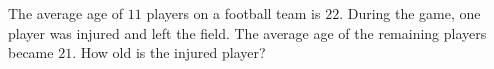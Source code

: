 The average age of $11$ players on a football team is $22$. During the game, one player was injured and left the field. The average age of the remaining players became $21$. How old is the injured player?
